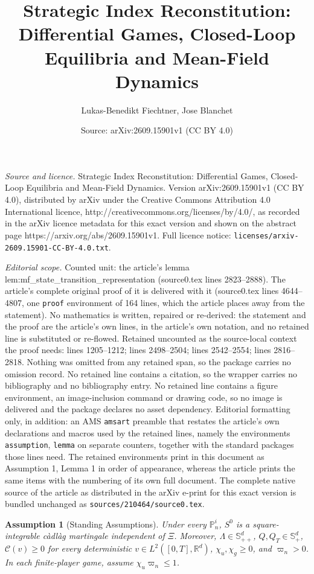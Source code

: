 \documentclass[10pt,a4paper]{amsart}
\title{Strategic Index Reconstitution: Differential Games, Closed-Loop Equilibria and Mean-Field Dynamics}
\author{Lukas-Benedikt Fiechtner, Jose Blanchet}
\date{Source: arXiv:2609.15901v1 (CC BY 4.0)}
\newtheorem{assumption}{Assumption}
\begin{document}
\maketitle

\noindent\emph{Source and licence.} Strategic Index Reconstitution: Differential Games, Closed-Loop Equilibria and Mean-Field Dynamics. Version arXiv:2609.15901v1 (CC BY 4.0), distributed by arXiv under the Creative Commons Attribution 4.0 International licence, http://creativecommons.org/licenses/by/4.0/, as recorded in the arXiv licence metadata for this exact version and shown on the abstract page https://arxiv.org/abs/2609.15901v1. Full licence notice: \texttt{licenses/arxiv-2609.15901-CC-BY-4.0.txt}.\par\smallskip

\noindent\textit{Editorial scope.} Counted unit: the article's lemma lem:mf\_state\_transition\_representation (source0.tex lines 2823--2888). The article's complete original proof of it is delivered with it (source0.tex lines 4644--4807, one \texttt{proof} environment of 164 lines, which the article places away from the statement). No mathematics is written, repaired or re-derived: the statement and the proof are the article's own lines, in the article's own notation, and no retained line is substituted or re-flowed.  Retained uncounted as the source-local context the proof needs: lines 1205--1212; lines 2498--2504; lines 2542--2554; lines 2816--2818.  Nothing was omitted from any retained span, so the package carries no omission record.  No retained line contains a citation, so the wrapper carries no bibliography and no bibliography entry.  No retained line contains a figure environment, an image-inclusion command or drawing code, so no image is delivered and the package declares no asset dependency.  Editorial formatting only, in addition: an AMS \texttt{amsart} preamble that restates the article's own declarations and macros used by the retained lines, namely the environments \texttt{assumption}, \texttt{lemma} on separate counters, together with the standard packages those lines need.  The retained environments print in this document as Assumption 1, Lemma 1 in order of appearance, whereas the article prints the same items with the numbering of its own full document.  The complete native source of the article as distributed in the arXiv e-print for this exact version is bundled unchanged as \texttt{sources/210464/source0.tex}.
\begin{assumption}[Standing Assumptions]\label{ass:standing_model}
Under every \(\mathbb P_n^i\), \(S^0\) is a square-integrable càdlàg martingale
independent of \(\Xi\). Moreover, \(\Lambda\in\mathbb S_{++}^d\),
\(Q,Q_T\in\mathbb S_+^d\), \(\mathcal C(v)\geq0\) for every deterministic
\(v\in L^2([0,T],\mathbb R^d)\), \(\chi_u,\chi_g\geq0\), and
\(\varpi_n>0\). In each finite-player game, assume
\(\chi_u\varpi_n\leq1\).
\end{assumption}
\end{document}
